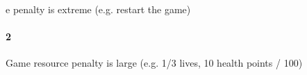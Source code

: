 e penalty is extreme (e.g. restart the game)\paragraph{2}Game resource penalty is large (e.g. 1/3 lives, 10 health points / 100)\paragra